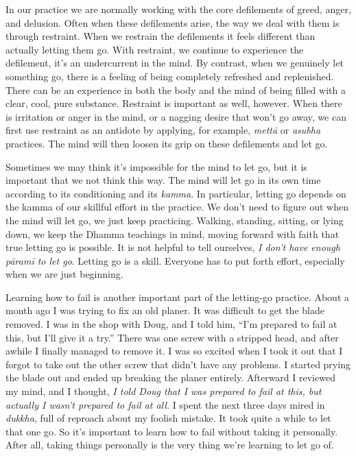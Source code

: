 
In our practice we are normally working with the core defilements of 
greed, anger, and delusion. Often when these defilements arise, the way 
we deal with them is through restraint. When we restrain the 
defilements it feels different than actually letting them go. With 
restraint, we continue to experience the defilement, it's an 
undercurrent in the mind. By contrast, when we genuinely let something 
go, there is a feeling of being completely refreshed and replenished. 
There can be an experience in both the body and the mind of being 
filled with a clear, cool, pure substance. Restraint is important as 
well, however. When there is irritation or anger in the mind, or a 
nagging desire that won't go away, we can first use restraint as an 
antidote by applying, for example, \emph{mettā} or \emph{asubha} 
practices. The mind will then loosen its grip on these defilements and 
let go.

Sometimes we may think it's impossible for the mind to let go, but it 
is important that we not think this way. The mind will let go in its 
own time according to its conditioning and its \emph{kamma}. In 
particular, letting go depends on the kamma of our skillful effort in 
the practice. We don't need to figure out when the mind will let go, we 
just keep practicing. Walking, standing, sitting, or lying down, we 
keep the Dhamma teachings in mind, moving forward with faith that true 
letting go is possible. It is not helpful to tell ourselves, \emph{I 
don't have enough pāramī to let go}. Letting go is a skill. Everyone 
has to put forth effort, especially when we are just beginning.

Learning how to fail is another important part of the letting-go 
practice. About a month ago I was trying to fix an old planer. It was 
difficult to get the blade removed. I was in the shop with Doug, and I 
told him, ``I'm prepared to fail at this, but I'll give it a try.'' 
There was one screw with a stripped head, and after awhile I finally 
managed to remove it. I was so excited when I took it out that I forgot 
to take out the other screw that didn't have any problems. I started 
prying the blade out and ended up breaking the planer entirely. 
Afterward I reviewed my mind, and I thought, \emph{I told Doug that I 
was prepared to fail at this, but actually I wasn't prepared to fail at 
all.} I spent the next three days mired in \emph{dukkha}, full of 
reproach about my foolish mistake. It took quite a while to let that 
one go. So it's important to learn how to fail without taking it 
personally. After all, taking things personally is the very thing we're 
learning to let go of.

